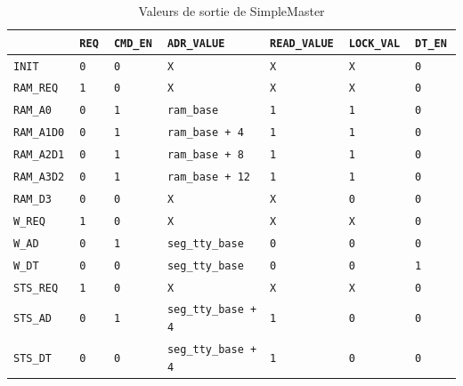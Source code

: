 \documentclass{article}
\begin{document}
\begin{table}[H]
\begin{minipage}{.6\linewidth}
\centering
\caption{Valeurs de sortie de SimpleMaster}
\begin{tabular}{|l|l|l|l|l|l|l|}
\hline
                  & \tt{REQ}       & \tt{CMD\_EN}   & \tt{ADR\_VALUE}         & \tt{READ\_VALUE}   & \tt{LOCK\_VAL} & \tt{DT\_EN}    \\
\hline
\tt{INIT}         & \tt{0}         & \tt{0}         & \tt{X}                  & \tt{X}             & \tt{X}         & \tt{0}         \\
\tt{RAM\_REQ}     & \tt{1}         & \tt{0}         & \tt{X}                  & \tt{X}             & \tt{X}         & \tt{0}         \\
\tt{RAM\_A0}      & \tt{0}         & \tt{1}         & \tt{ram\_base}          & \tt{1}             & \tt{1}         & \tt{0}         \\
\tt{RAM\_A1D0}    & \tt{0}         & \tt{1}         & \tt{ram\_base + 4}      & \tt{1}             & \tt{1}         & \tt{0}         \\
\tt{RAM\_A2D1}    & \tt{0}         & \tt{1}         & \tt{ram\_base + 8}      & \tt{1}             & \tt{1}         & \tt{0}         \\
\tt{RAM\_A3D2}    & \tt{0}         & \tt{1}         & \tt{ram\_base + 12}     & \tt{1}             & \tt{1}         & \tt{0}         \\
\tt{RAM\_D3}      & \tt{0}         & \tt{0}         & \tt{X}                  & \tt{X}             & \tt{0}         & \tt{0}         \\
\tt{W\_REQ}       & \tt{1}         & \tt{0}         & \tt{X}                  & \tt{X}             & \tt{X}         & \tt{0}         \\
\tt{W\_AD}        & \tt{0}         & \tt{1}         & \tt{seg\_tty\_base}     & \tt{0}             & \tt{0}         & \tt{0}         \\
\tt{W\_DT}        & \tt{0}         & \tt{0}         & \tt{seg\_tty\_base}     & \tt{0}             & \tt{0}         & \tt{1}         \\
\tt{STS\_REQ}     & \tt{1}         & \tt{0}         & \tt{X}                  & \tt{X}             & \tt{X}         & \tt{0}         \\
\tt{STS\_AD}      & \tt{0}         & \tt{1}         & \tt{seg\_tty\_base + 4} & \tt{1}             & \tt{0}         & \tt{0}         \\
\tt{STS\_DT}      & \tt{0}         & \tt{0}         & \tt{seg\_tty\_base + 4} & \tt{1}             & \tt{0}         & \tt{0}         \\

\end{tabular}
\end{minipage}
\end{table}
\end{document}
